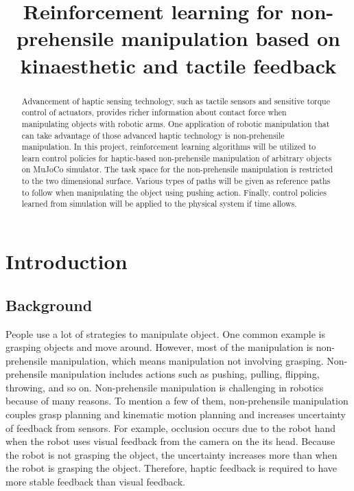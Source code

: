 \documentclass{article}
\title{Reinforcement learning for non-prehensile manipulation based on kinaesthetic and tactile feedback}
\author{
}
\begin{document}

\maketitle

\begin{abstract}
 
Advancement of haptic sensing technology, such as tactile sensors and sensitive torque control of actuators, provides richer information about contact force when manipulating objects with robotic arms. One application of robotic manipulation that can take advantage of those advanced haptic technology is non-prehensile manipulation. In this project, reinforcement learning algorithms will be utilized to learn control policies for haptic-based non-prehensile manipulation of arbitrary objects on MuJoCo simulator. The task space for the non-prehensile manipulation is restricted to the two dimensional surface. Various types of paths will be given as reference paths to follow when manipulating the object using pushing action. Finally, control policies learned from simulation will be applied to the physical system if time allows.

\end{abstract}

\section{Introduction}

\subsection{Background}

People use a lot of strategies to manipulate object. One common example is grasping objects and move around. However, most of the manipulation is non-prehensile manipulation, which means manipulation not involving grasping. Non-prehensile manipulation includes actions such as pushing, pulling, flipping, throwing, and so on. Non-prehensile manipulation is challenging in robotics because of many reasons. To mention a few of them, non-prehensile manipulation couples grasp planning and kinematic motion planning and increases uncertainty of feedback from sensors. For example, occlusion occurs due to the robot hand when the robot uses visual feedback from the camera on the its head. Because the robot is not grasping the object, the uncertainty increases more than when the robot is grasping the object. Therefore, haptic feedback is required to have more stable feedback than visual feedback.
\end{document}
